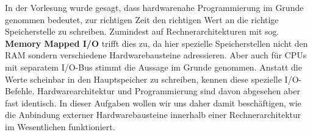 

In der Vorlesung wurde gesagt, dass hardwarenahe Programmierung im Grunde genommen
bedeutet, zur richtigen Zeit den richtigen Wert an die richtige Speicherstelle zu
schreiben. Zumindest auf Rechnerarchitekturen mit sog. \textbf{Memory Mapped I/O}
trifft dies zu, da hier spezielle Speicherstellen nicht den RAM sondern verschiedene
Hardwarebausteine adressieren. Aber auch für CPUs mit separatem I/O-Bus stimmt die
Aussage im Grunde genommen. Anstatt die Werte scheinbar in den Hauptspeicher zu
schreiben, kennen diese spezielle I/O-Befehle. Hardwarearchitektur und Programmierung
sind davon abgesehen aber fast identisch. In dieser Aufgaben wollen wir uns daher
damit beschäftigen, wie die Anbindung externer Hardwarebausteine innerhalb einer
Rechnerarchitektur im Wesentlichen funktioniert.

